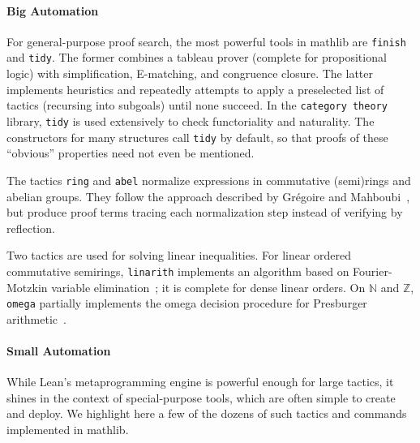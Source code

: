 \documentclass[sigplan]{acmart}\settopmatter{}
\newcommand{\mathlib}{\textsf{mathlib}\xspace}
\begin{document}

\paragraph{Big Automation} For general-purpose proof search,
the most powerful tools in \mathlib are \lstinline{finish} and \lstinline{tidy}.
The former combines a tableau prover (complete for  propositional logic)
with simplification, E-matching, and congruence closure.
The latter implements heuristics
and repeatedly attempts to apply a preselected list of tactics (recursing into subgoals)
until none succeed.
In the \texttt{category theory} library, \lstinline{tidy} is used extensively
to check functoriality and naturality.
The constructors for many structures call \lstinline{tidy} by default,
so that proofs of these ``obvious'' properties need not even be mentioned.

The tactics \lstinline{ring} and \lstinline{abel}
normalize expressions in commutative (semi)rings and abelian groups.
They follow the approach described by Gr\'egoire and Mahboubi~\cite{Greg05},
but produce proof terms tracing each normalization step
instead of verifying by reflection.

Two tactics are used for solving linear inequalities.
For linear ordered commutative semirings,
\lstinline{linarith} implements an algorithm based on Fourier-Motzkin variable elimination~\cite{Will86};
it is complete for dense linear orders.
On $\mathbb{N}$ and $\mathbb{Z}$,
\lstinline{omega} partially implements the omega decision procedure
for Presburger arithmetic~\cite{Baek19, Pugh91}. %



\paragraph{Small Automation} While Lean's metaprogramming engine is powerful enough for large tactics,
it shines in the context of special-purpose tools,
which are often simple to create and deploy.
We highlight here a few of the dozens of such tactics and commands implemented in \mathlib.
\end{document}
